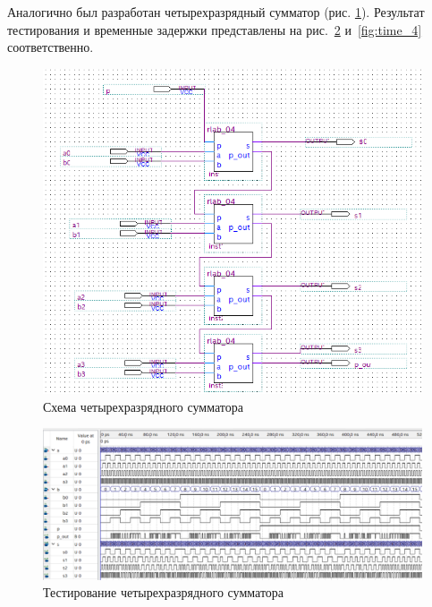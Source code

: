 \documentclass[a4paper,14pt]{article}
\begin{document}
Аналогично был разработан четырехразрядный сумматор (рис. \ref{fig:schema_4}).
Результат тестирования и временные задержки представлены на рис.~\ref{fig:wave_4} и~\ref{fig:time_4} соответственно.

\begin{figure}[H]
	\centering
	\includegraphics[width=\linewidth]{image/schema_4}
	\caption{Схема четырехразрядного сумматора}
	\label{fig:schema_4}
\end{figure}

\begin{figure}[H]
	\centering
	\includegraphics[width=\linewidth]{image/wave_4}
	\caption{Тестирование четырехразрядного сумматора}
	\label{fig:wave_4}
\end{figure}
\end{document}
